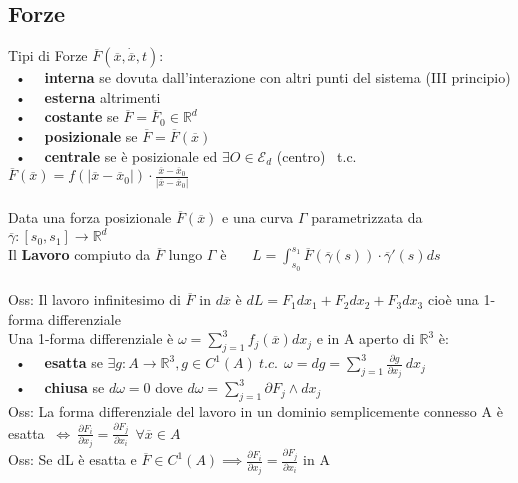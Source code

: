 \documentclass{article}
\begin{document}
\subsection{Forze}
%
Tipi di Forze $\overline{F}(\overline{x}, \dot{\overline{x}},t)$:\\
\ • \ \ \textbf{interna} se dovuta dall'interazione con altri punti del sistema (III principio)\\
\ • \ \ \textbf{esterna} altrimenti \\
\ • \ \ \textbf{costante} se $\overline{F} = \overline{F}_0 \in \mathbb{R}^d$\\
\ • \ \ \textbf{posizionale} se $\overline{F} = \overline{F}(\overline{x})$\\
\ • \ \ \textbf{centrale} se è posizionale ed $\exists O \in \mathcal{E}_d$ (centro) \ t.c. $\overline{F}(\overline{x})=f(|\overline{x}-\overline{x}_0|)\cdot \frac{\overline{x}-\overline{x}_0}{|\overline{x}-\overline{x}_0|}$\\ \\
%
%
%
Data una forza posizionale $\overline{F}(\overline{x})$ e una curva $\Gamma$ parametrizzata da $\overline{\gamma}:[s_0,s_1]\rightarrow\mathbb{R}^d$\\
Il \textbf{Lavoro} compiuto da $\overline{F}$ lungo $\Gamma$ è \ \ \ $L=\int^{s_1}_{s_0} \overline{F}(\overline{\gamma}(s))\cdot\overline{\gamma}'(s)ds$ \\ \\
%
%
%
Oss: Il lavoro infinitesimo di $\overline{F}$ in $d\overline{x}$ è $dL = F_1dx_1 + F_2dx_2+ F_3dx_3$ cioè una 1-forma differenziale\\
%
Una 1-forma differenziale è $\omega=\sum_{j=1}^3 f_j(\overline{x})dx_j$ e in A aperto di $\mathbb{R}^3$ è:\\
\ • \ \ \textbf{esatta}  se $\exists g:A\rightarrow\mathbb{R}^3, g\in C^1(A) \ t.c. \ \ \omega = dg = \sum_{j=1}^3 \frac{\partial g}{\partial x_j} \ dx_j$ \\
\ • \ \ \textbf{chiusa} se $d\omega=0$ dove $d\omega= \sum_{j=1}^3 \partial F_j \wedge dx_j$ \\
%
Oss: La forma differenziale del lavoro in un dominio semplicemente connesso A è esatta  $\ \Leftrightarrow \ \frac{\partial F_i}{\partial x_j}=\frac{\partial F_j}{\partial x_i} \ \ \forall \overline{x}\in A$\\
%
Oss: Se dL è esatta e $\overline{F}\in C^1(A) \implies \frac{\partial F_i}{\partial x_j}=\frac{\partial F_j}{\partial x_i}$ in A \\ \\
\end{document}
